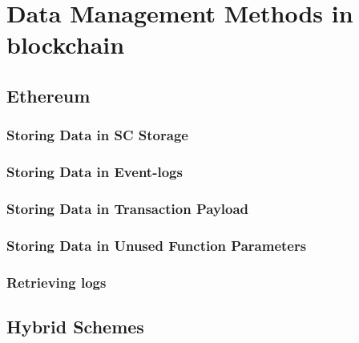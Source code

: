 \chapter{Data Management Methods in blockchain}\label{chapter:data_management}

\section{Ethereum}\label{sec:}
\subsection{Storing Data in SC Storage}\label{subsection:}
\subsection{Storing Data in Event-logs}\label{subsection:}
\subsection{Storing Data in Transaction Payload}\label{subsection:}
\subsection{Storing Data in Unused Function Parameters}\label{subsection:}
\subsection{Retrieving logs}\label{subsection:}


\section{Hybrid Schemes}\label{sec:}

